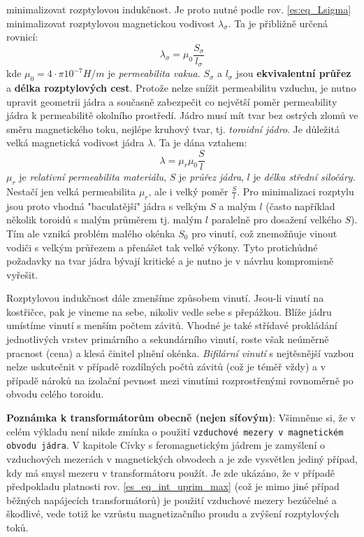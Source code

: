     minimalizovat rozptylovou indukčnost. Je proto nutné podle rov. \ref{es:eq_Lsigma} 
    minimalizovat rozptylovou magnetickou vodivost $\lambda_\sigma$. Ta je přibližně určená rovnicí:
    \begin{equation}\label{es:eq_rozptyl_vodivost}
      \lambda_\sigma= \mu_0\frac{S_\sigma}{l_\sigma}
    \end{equation}
    kde $\mu_0=4\cdot\pi10^{-7}H/m$ je \emph{permeabilita vakua}. $S_\sigma$ a $l_\sigma$ jsou
    \textbf{ekvivalentní průřez} a \textbf{délka rozptylových cest}. Protože nelze snížit  
    permeabilitu vzduchu, je nutno upravit geometrii jádra a současně zabezpečit co největší poměr 
    permeability jádra k permeabilitě okolního prostředí. Jádro musí mít tvar bez ostrých zlomů ve 
    směru magnetického toku, nejlépe kruhový tvar, tj. \emph{toroidní jádro}. Je důležitá velká 
    magnetická vodivost jádra $\lambda$. Ta je dána vztahem:
    \begin{equation}\label{es:eq_vodivost_jadra}
      \lambda= \mu_r\mu_0\frac{S}{l}
    \end{equation}
    $\mu_r$ je \emph{relativní permeabilita materiálu}, $S$ je \emph{průřez jádra}, $l$ je 
    \emph{délka střední siločáry}. Nestačí jen velká permeabilita  $\mu_r$, ale i velký poměr 
    $\frac{S}{l}$. Pro minimalizaci rozptylu jsou proto vhodná "baculatější" jádra s velkým $S$ a 
    malým $l$ (často například několik toroidů s malým průměrem tj. malým $l$ paralelně pro 
    dosažení velkého $S$). Tím ale vzniká problém malého okénka $S_0$ pro vinutí, což znemožňuje 
    vinout vodiči s velkým průřezem a přenášet tak velké výkony. Tyto protichůdné požadavky na tvar 
    jádra bývají kritické a je nutno je v návrhu kompromisně vyřešit.

    Rozptylovou indukčnost dále zmenšíme způsobem vinutí. Jsou-li vinutí na kostřičce, pak je 
    vineme na sebe, nikoliv vedle sebe s přepážkou. Blíže jádru umístíme vinutí s menším počtem 
    závitů. Vhodné je také střídavé prokládání jednotlivých vrstev primárního a sekundárního 
    vinutí, roste však neúměrně pracnost (cena) a klesá činitel plnění okénka. \emph{Bifilární 
    vinutí} s nejtěsnější vazbou nelze uskutečnit v případě rozdílných počtů závitů (což je téměř 
    vždy) a v případě nároků na izolační pevnost mezi vinutími rozprostřenými rovnoměrně po obvodu 
    celého toroidu.

    \begin{note}
      \textbf{Poznámka k transformátorům obecně (nejen síťovým)}:
      \newline Všimněme si, že v celém výkladu není nikde zmínka o použití \texttt{vzduchové mezery 
      v 
      magnetickém obvodu jádra}. V kapitole Cívky s feromagnetickým jádrem je zamyšlení o 
      vzduchových mezerách v magnetických obvodech a je zde vysvětlen jediný případ, kdy má smysl 
      mezeru v transformátoru použít. Je zde ukázáno, že v případě předpokladu platnosti rov. 
      \ref{es_eq_int_uprim_max} (což je mimo jiné případ běžných napájecích transformátorů) je 
      použití vzduchové mezery bezúčelné a škodlivé, vede totiž ke vzrůstu magnetizačního proudu a 
      zvýšení rozptylových toků.
    \end{note}

